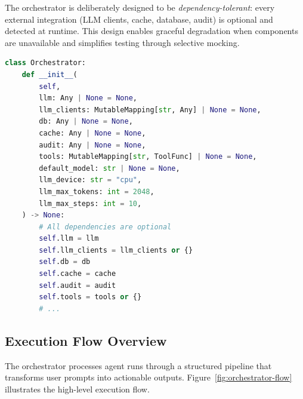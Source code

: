 The orchestrator is deliberately designed to be \emph{dependency-tolerant}: every external integration (LLM clients, cache, database, audit) is optional and detected at runtime. This design enables graceful degradation when components are unavailable and simplifies testing through selective mocking.

\begin{lstlisting}[language=Python, caption={Orchestrator class initialization showing dependency tolerance}, label=lst:orchestrator-init]
class Orchestrator:
    def __init__(
        self,
        llm: Any | None = None,
        llm_clients: MutableMapping[str, Any] | None = None,
        db: Any | None = None,
        cache: Any | None = None,
        audit: Any | None = None,
        tools: MutableMapping[str, ToolFunc] | None = None,
        default_model: str | None = None,
        llm_device: str = "cpu",
        llm_max_tokens: int = 2048,
        llm_max_steps: int = 10,
    ) -> None:
        # All dependencies are optional
        self.llm = llm
        self.llm_clients = llm_clients or {}
        self.db = db
        self.cache = cache
        self.audit = audit
        self.tools = tools or {}
        # ...
\end{lstlisting}

\subsection{Execution Flow Overview}

The orchestrator processes agent runs through a structured pipeline that transforms user prompts into actionable outputs. Figure~\ref{fig:orchestrator-flow} illustrates the high-level execution flow.

